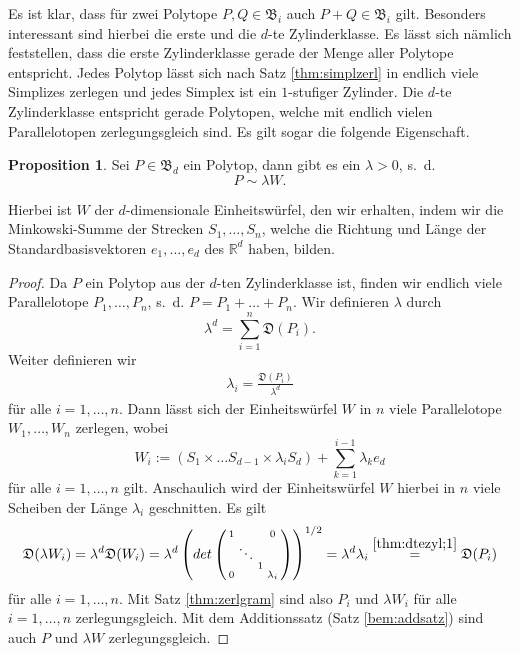 \documentclass[11pt,titlepage]{article}
\newcommand{\setR}{\mathbb{R}}
\theoremstyle{definition}
\newtheorem{proposition}[theorem]{Proposition}
\theoremstyle{remark}
\begin{document}
	Es ist klar, dass für zwei Polytope $P,Q\in \mathfrak{B}_i$ 
	auch $P+Q\in\mathfrak{B}_i$ gilt. 
	Besonders interessant sind hierbei die erste und die $d$-te Zylinderklasse. 
	Es lässt sich nämlich feststellen, dass die erste Zylinderklasse gerade 
	der Menge aller Polytope entspricht. Jedes Polytop lässt sich nach Satz  
	\ref{thm:simplzerl} in endlich viele Simplizes zerlegen und jedes Simplex ist ein $1$-stufiger Zylinder. 
	Die $d$-te Zylinderklasse entspricht gerade Polytopen, welche mit endlich vielen 
	Parallelotopen zerlegungsgleich sind. Es gilt sogar die folgende Eigenschaft.
	
	\begin{proposition} \label{bem:dteZylinderklasse}
		Sei $P\in\mathfrak{B}_d$ ein Polytop, dann gibt es ein $\lambda>0$, s.~d. 
		\[P\sim \lambda W.\] 
	\end{proposition}
	
	Hierbei ist $W$ der $d$-dimensionale Einheitswürfel, den wir erhalten, 
	indem wir die Minkowski-Summe der Strecken $S_1,\ldots,S_n$, 
	welche die Richtung und Länge der Standardbasisvektoren $e_1,\ldots, e_d$ 
	des $\setR^d$ haben, bilden.
	
	\begin{proof}
		Da $P$ ein Polytop aus der $d$-ten Zylinderklasse ist, finden 
		wir endlich viele Parallelotope $P_1,\ldots, P_n$, s.~d. 
		$P=P_1+\ldots+P_n$. Wir definieren $\lambda$ durch 
		\[\lambda^d =\sum_{i=1}^n \mathfrak{D}(P_i).\]
		Weiter definieren wir 
		\begin{align}
			\lambda_i =\frac{\mathfrak{D}(P_i)}{\lambda^d} \label{thm:dtezyl;1}
		\end{align}
		für alle $i=1,\ldots,n$. Dann lässt sich der Einheitswürfel $W$ in $n$ viele 
		Parallelotope $W_1,\ldots,W_n$ zerlegen, wobei
		\[W_i:=(S_1\times\ldots S_{d-1}\times \lambda_i S_d)+
		\sum_{k=1}^{i-1} \lambda_k e_d\]
		für alle $i=1,\ldots,n$ gilt. Anschaulich wird der Einheitswürfel $W$  hierbei in $n$ viele Scheiben der Länge $\lambda_i$ geschnitten. 
		Es gilt 
		\[\mathfrak{D}(\lambda W_i)=\lambda^d \mathfrak{D}(W_i)=
		\lambda^d \left(det \left(\begin{smallmatrix}
		1 & \ &\ &0 \\
		\ &\ddots &\ &\ \\
		\ & \ &  1 &\ \\
		0 & \ & \ & \lambda_i
		\end{smallmatrix}\right)\right)^{1/2}=\lambda^d \lambda_i\overset{\ref{thm:dtezyl;1}}{=}\mathfrak{D}(P_i)\]
		für alle $i=1,\ldots,n$. Mit Satz \ref{thm:zerlgram} 
		sind also $P_i$ und $\lambda W_i$ für alle $i=1,\ldots,n$ zerlegungsgleich. 
		Mit dem Additionssatz (Satz \ref{bem:addsatz}) 
		sind auch $P$ und $\lambda W$ zerlegungsgleich.
	\end{proof}
	
\end{document}
